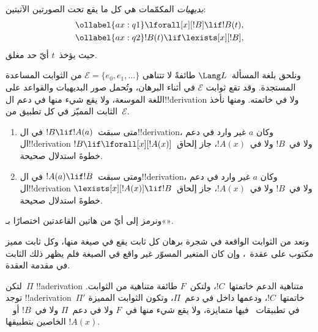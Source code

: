 \documentclass[../../../include/open-logic-section]{subfiles}
\begin{document}


\begin{defn}
\emph{بديهيات} المكمّمات هي كل ما يقع تحت الصورتين الآتيتين:
\begin{align}
\ollabel{ax:q1} & \lforall[x][!B] \lif !B(t), \\
\ollabel{ax:q2} & !B(t) \lif \lexists[x][!B],
\end{align}
حيث يؤخذ~$t$ أيّ حد مغلق.
\end{defn}

ونلحق بلغة المسألة~$\Lang L$ طائفةً لا تتناهى
$\mathcal E=\{e_0,e_1,\dots\}$ من الثوابت المساعدة المستجدة. وقد تقع ثوابت
$\mathcal E$ في أثناء البرهان، وتُحمل صور البديهيات والقواعد على اللغة
الموسعة، ولا يقع شيء منها في دعم ال!!{derivation} ولا في خاتمته. ومنها
نأخذ الثابت المميّز في كل تطبيق من~$\mathcal E$.

\begin{defn}[قواعد المكمّمات]
\begin{enumerate}
\item متى سبقت~$!B \lif !A(a)$ في ال!!{derivation}، وكان
  $a$ غير وارد في دعم ال!!{derivation} ولا في~$!B$ ولا في~$!A(x)$، جاز إلحاق~$!B \lif
  \lforall[x][!A(x)]$ خطوةَ استدلال صحيحة.
\item ومتى سبقت~$!A(a) \lif !B$ في ال!!{derivation}، وكان
  $a$ غير وارد في دعم ال!!{derivation} ولا في~$!B$ ولا في~$!A(x)$، جاز إلحاق~$\lexists[x][!A(x)] \lif
  !B$ خطوةَ استدلال صحيحة.
\end{enumerate}
\end{defn}

ونرمز إلى أيّ من هاتين القاعدتين اختصارًا بـ«\QR».

ونعد من الثوابت الواقعة في شجرة برهان كل ثابت يقع في صيغة منها، وكل ثابت
مميز مكتوب على عقدة~\QR{}، وإن كان المتغير المسوّر غير واقع في الصيغة فلم
يظهر ذلك الثابت في مقدمة العقدة.

\begin{lem}
لتكن~$\Pi$ !!a{derivation} متناهية الدعم خاتمتها~$!C$، ولتكن~$F$
طائفة متناهية من الثوابت. توجد !!a{derivation}~$\Pi'$ خاتمتها~$!C$،
ودعمها داخل في دعم~$\Pi$، وتكون الثوابت المميزة في تطبيقات~\QR{} فيها
متمايزة، ولا يقع شيء منها في~$F$ ولا في دعم~$\Pi$ ولا في~$!B$ أو
~$!A(x)$ الخاصين بتطبيقها.
\end{lem}
\end{document}

